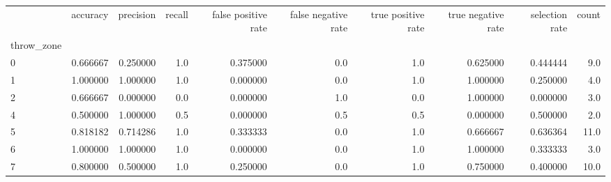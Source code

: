 \begin{tabular}{lrrrrrrrrr}
\toprule
{} &  accuracy &  precision &  recall &  false positive rate &  false negative rate &  true positive rate &  true negative rate &  selection rate &  count \\
throw\_zone &           &            &         &                      &                      &                     &                     &                 &        \\
\midrule
0          &  0.666667 &   0.250000 &     1.0 &             0.375000 &                  0.0 &                 1.0 &            0.625000 &        0.444444 &    9.0 \\
1          &  1.000000 &   1.000000 &     1.0 &             0.000000 &                  0.0 &                 1.0 &            1.000000 &        0.250000 &    4.0 \\
2          &  0.666667 &   0.000000 &     0.0 &             0.000000 &                  1.0 &                 0.0 &            1.000000 &        0.000000 &    3.0 \\
4          &  0.500000 &   1.000000 &     0.5 &             0.000000 &                  0.5 &                 0.5 &            0.000000 &        0.500000 &    2.0 \\
5          &  0.818182 &   0.714286 &     1.0 &             0.333333 &                  0.0 &                 1.0 &            0.666667 &        0.636364 &   11.0 \\
6          &  1.000000 &   1.000000 &     1.0 &             0.000000 &                  0.0 &                 1.0 &            1.000000 &        0.333333 &    3.0 \\
7          &  0.800000 &   0.500000 &     1.0 &             0.250000 &                  0.0 &                 1.0 &            0.750000 &        0.400000 &   10.0 \\
\bottomrule
\end{tabular}
